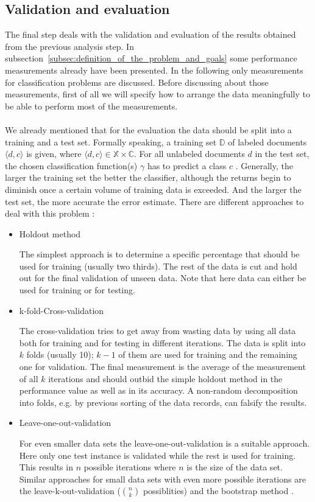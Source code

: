 \documentclass[article,type=msc,colorback,accentcolor=tud7b]{tudthesis}
\begin{document}
  \subsection{Validation and evaluation}
  \label{subsec:validation_and_evaluation}
    The final step deals with the validation and evaluation of the results obtained from the previous analysis step. In subsection~\ref{subsec:definition_of_the_problem_and_goals} some performance measurements already have been presented. In the following only measurements for classification problems are discussed. Before discussing about those measurements, first of all we will specify how to arrange the data meaningfully to be able to perform most of the measurements. \\\\
    We already mentioned that for the evaluation the data should be split into a training and a test set. Formally speaking, a training set $\mathbb{D}$ of labeled documents $\langle d,c\rangle$ is given, where $\langle d,c\rangle\in\mathbb{X}\times\mathbb{C}$. For all unlabeled documents $d$ in the test set, the chosen classification function(s) $\gamma$ has to predict a class $c$ \autocite[Chapter~13.1]{Manning2008}. Generally, the larger the training set the better the classifier, although the returns begin to diminish once a certain volume of training data is exceeded. And the larger the test set, the more accurate the error estimate. There are different approaches to deal with this problem \autocite[Chapter~5]{Witten2005}:
    \begin{itemize}
      \item Holdout method
      
        The simplest approach is to determine a specific percentage that should be used for training (usually two thirds). The rest of the data is cut and hold out for the final validation of unseen data. Note that here data can either be used for training or for testing.
      \item k-fold-Cross-validation
      
        The cross-validation tries to get away from wasting data by using all data both for training and for testing in different iterations. The data is split into $k$ folds (usually 10); $k-1$ of them are used for training and the remaining one for validation. The final measurement is the average of the measurement of all $k$ iterations and should outbid the simple holdout method in the performance value as well as in its accuracy. A non-random decomposition into folds, e.g. by previous sorting of the data records, can falsify the results.
      \item Leave-one-out-validation
      
        For even smaller data sets the leave-one-out-validation is a suitable approach. Here only one test instance is validated while the rest is used for training. This results in $n$ possible iterations where $n$ is the size of the data set. Similar approaches for small data sets with even more possible iterations are the leave-k-out-validation ($\binom{n}{k}$ possiblities) and the bootstrap method \autocite[Chapter~4]{Arlot2010}.
    \end{itemize}
\end{document}
